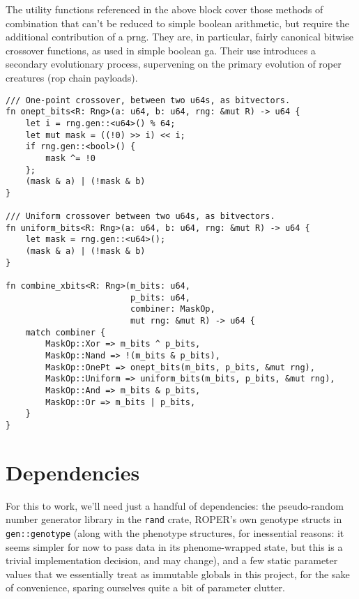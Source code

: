 \documentclass[11pt]{article}
\begin{document}
The utility functions referenced in the above block cover those methods
of combination that can't be reduced to simple boolean arithmetic, but
require the additional contribution of a \gls{prng}. They are, in particular,
fairly canonical bitwise crossover functions, as used in simple boolean
\gls{ga}. Their use introduces a secondary evolutionary process, supervening on
the primary evolution of \gls{roper} creatures (\gls{rop} chain payloads). 

\lstset{language=rust,label=org75b8850,caption= ,captionpos=b,numbers=none}
\begin{lstlisting}
/// One-point crossover, between two u64s, as bitvectors.
fn onept_bits<R: Rng>(a: u64, b: u64, rng: &mut R) -> u64 {
    let i = rng.gen::<u64>() % 64;
    let mut mask = ((!0) >> i) << i;
    if rng.gen::<bool>() {
        mask ^= !0
    };
    (mask & a) | (!mask & b)
}

/// Uniform crossover between two u64s, as bitvectors.
fn uniform_bits<R: Rng>(a: u64, b: u64, rng: &mut R) -> u64 {
    let mask = rng.gen::<u64>();
    (mask & a) | (!mask & b)
}

fn combine_xbits<R: Rng>(m_bits: u64,
                         p_bits: u64,
                         combiner: MaskOp,
                         mut rng: &mut R) -> u64 {
    match combiner {
        MaskOp::Xor => m_bits ^ p_bits,
        MaskOp::Nand => !(m_bits & p_bits),
        MaskOp::OnePt => onept_bits(m_bits, p_bits, &mut rng),
        MaskOp::Uniform => uniform_bits(m_bits, p_bits, &mut rng),
        MaskOp::And => m_bits & p_bits,
        MaskOp::Or => m_bits | p_bits,
    }
}
\end{lstlisting}

\section{Dependencies}
\label{sec:orga0d882f}

For this to work, we'll need just a handful of dependencies: the pseudo-random
number generator library in the \texttt{rand} crate, ROPER's own genotype structs in
\texttt{gen::genotype} (along with the phenotype structures, for inessential reasons:
it seems simpler for now to pass data in its phenome-wrapped state, but this is
a trivial implementation decision, and may change), and a few static parameter
values that we essentially treat as immutable globals in this project, for
the sake of convenience, sparing ourselves quite a bit of parameter clutter.
\end{document}
